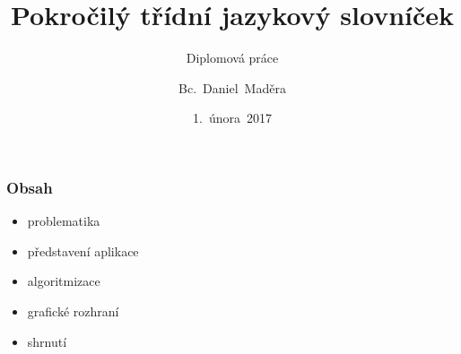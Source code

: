 




\usepackage{palatino}
\usepackage{graphicx}
\usepackage{transparent}


\title[Pokročilý třídní jazykový slovníček]{Pokročilý třídní jazykový slovníček}
\subtitle{Diplomová práce}
\author[Bc.~Daniel~Maděra]{Bc.~Daniel~Maděra}
\date{1.~února~2017}
\newcommand{\TextTitulniStranaPodLinkou}{\tiny
Studentská 2 {\color{FM_TUL} |} 461\,17 Liberec 2 {\color{FM_TUL} |} {daniel.madera@tul.cz} {\color{FM_TUL} |} 
\href{http://www.fm.tul.cz/}{www.fm.tul.cz}}

\renewcommand{\inserttotalframenumber}{\pageref{lastslide}}




\begin{frame}
    \titlepage
\end{frame}

\begin{frame}
    \frametitle{Obsah}
    \begin{itemize}
        \item problematika
        \item představení aplikace
        \item algoritmizace
        \item grafické rozhraní
        \item shrnutí
    \end{itemize}
\end{frame}


